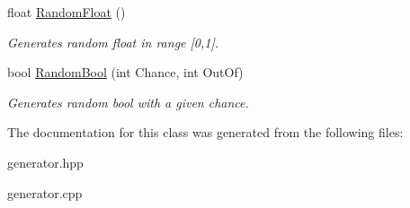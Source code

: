 \begin{DoxyCompactItemize}
\mbox{\label{classtfp_1_1_generator_class_a68ff86933098f9b809b25a63a10f7b9f}} 
float \mbox{\hyperlink{classtfp_1_1_generator_class_a68ff86933098f9b809b25a63a10f7b9f}{Random\+Float}} ()
\begin{DoxyCompactList}\small\item\em Generates random float in range \mbox{[}0,1\mbox{]}. \end{DoxyCompactList}\item 
\mbox{\label{classtfp_1_1_generator_class_aa20d471d4608e04c30533cda1253af2c}} 
bool \mbox{\hyperlink{classtfp_1_1_generator_class_aa20d471d4608e04c30533cda1253af2c}{Random\+Bool}} (int Chance, int Out\+Of)
\begin{DoxyCompactList}\small\item\em Generates random bool with a given chance. \end{DoxyCompactList}\end{DoxyCompactItemize}


The documentation for this class was generated from the following files\+:\begin{DoxyCompactItemize}
\item 
generator.\+hpp\item 
generator.\+cpp\end{DoxyCompactItemize}
